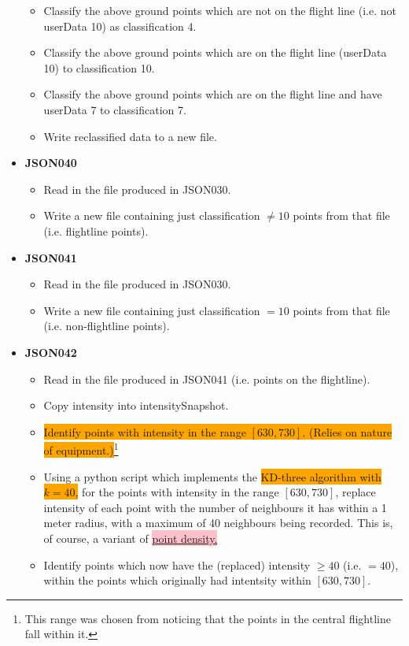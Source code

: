 \documentclass[a4paper,11pt,twoside]{article}
\theoremstyle{definition}
\theoremstyle{remark}
\newcommand{\sh}[1]{\colorbox{pink}{#1}}
\newcommand{\bad}[1]{\colorbox{orange}{#1}}
\begin{document}
\begin{itemize}
\begin{itemize}
\item Classify the above ground points which are not on the flight line (i.e. not userData 10) as classification 4.
\item Classify the above ground points which are on the flight line (userData 10) to classification 10.
\item Classify the above ground points which are on the flight line and have userData 7 to classification 7.
\item Write reclassified data to a new file.
\end{itemize}
\item \textbf{JSON040}
\begin{itemize}
\item Read in the file produced in JSON030.
\item Write a new file containing just classification $\neq 10$ points from that file (i.e. flightline points).
\end{itemize}
\item \textbf{JSON041}
\begin{itemize}
\item Read in the file produced in JSON030.
\item Write a new file containing just classification $= 10$ points from that file (i.e. non-flightline points).
\end{itemize}
\item \textbf{JSON042}
\begin{itemize}
\item Read in the file produced in JSON041 (i.e. points on the flightline).
\item Copy intensity into intensitySnapshot.
\item \bad{Identify points with intensity in the range $[630,730]$. (Relies on nature of equipment.)}\footnote{This range was chosen from noticing that the points in the central flightline fall within it.}
\item Using a python script which implements the \bad{KD-three algorithm with $k=40$,} for the points with intensity in the range $[630,730]$, replace intensity of each point with the number of neighbours it has within a 1 meter radius, with a maximum of 40 neighbours being recorded. This is, of course, a variant of \hyperref[crapptdens]{\sh{point density.}}
\item Identify points which now have the (replaced) intensity $\geqslant 40$ (i.e. $=40$), within the points which originally had intentsity within $[630,730]$.

\end{itemize}
\end{itemize}
\end{document}
